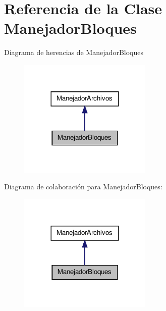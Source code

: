 \hypertarget{class_manejador_bloques}{\section{\-Referencia de la \-Clase \-Manejador\-Bloques}
\label{class_manejador_bloques}
}


\-Diagrama de herencias de \-Manejador\-Bloques
\nopagebreak
\begin{figure}[H]
\begin{center}
\leavevmode
\includegraphics[width=180pt]{class_manejador_bloques__inherit__graph}
\end{center}
\end{figure}


\-Diagrama de colaboración para \-Manejador\-Bloques\-:
\nopagebreak
\begin{figure}[H]
\begin{center}
\leavevmode
\includegraphics[width=180pt]{class_manejador_bloques__coll__graph}
\end{center}
\end{figure}
